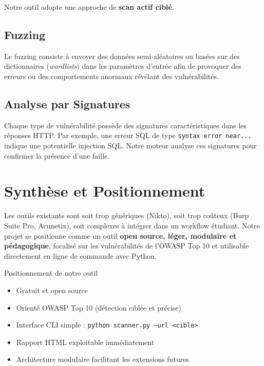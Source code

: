 \documentclass[12pt, a4paper]{report}
\begin{document}
Notre outil adopte une approche de \textbf{scan actif ciblé}.

\subsection{Fuzzing}

Le fuzzing consiste à envoyer des données semi-aléatoires ou basées sur des
dictionnaires (\textit{wordlists}) dans les paramètres d'entrée afin de provoquer
des erreurs ou des comportements anormaux révélant des vulnérabilités.

\subsection{Analyse par Signatures}

Chaque type de vulnérabilité possède des signatures caractéristiques dans les
réponses HTTP. Par exemple, une erreur SQL de type \texttt{syntax error near...}
indique une potentielle injection SQL. Notre moteur analyse ces signatures pour
confirmer la présence d'une faille.

\section{Synthèse et Positionnement}

Les outils existants sont soit trop génériques (Nikto), soit trop coûteux
(Burp Suite Pro, Acunetix), soit complexes à intégrer dans un workflow étudiant.
Notre projet se positionne comme un outil \textbf{open source, léger, modulaire
et pédagogique}, focalisé sur les vulnérabilités de l'OWASP Top 10 et utilisable
directement en ligne de commande avec Python.

\begin{infobox}{Positionnement de notre outil}
\begin{itemize}[leftmargin=1.5em, itemsep=2pt]
  \item Gratuit et open source
  \item Orienté OWASP Top 10 (détection ciblée et précise)
  \item Interface CLI simple : \texttt{python scanner.py --url <cible>}
  \item Rapport HTML exploitable immédiatement
  \item Architecture modulaire facilitant les extensions futures
\end{itemize}
\end{infobox}

\newpage
\end{document}

